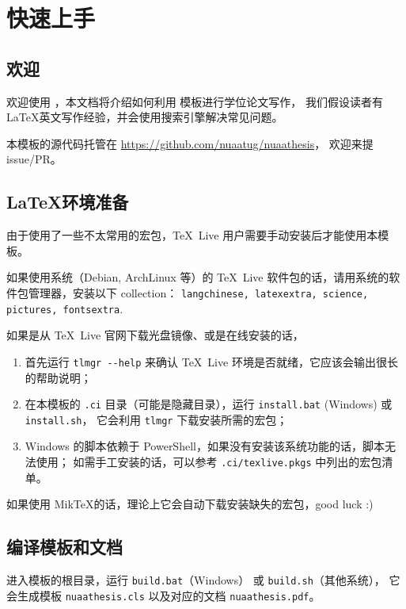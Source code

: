 
\chapter{快速上手}

\section{欢迎}

欢迎使用 \nuaathesis，本文档将介绍如何利用 \nuaathesis 模板进行学位论文写作，
我们假设读者有 \LaTeX 英文写作经验，并会使用搜索引擎解决常见问题。

本模板的源代码托管在 \url{https://github.com/nuaatug/nuaathesis}，
欢迎来提 issue/PR。

\section{\LaTeX 环境准备}

由于\nuaathesis 使用了一些不太常用的宏包，\TeX~Live 用户需要手动安装后才能使用本模板。

如果使用系统（Debian, ArchLinux 等）的 \TeX~Live 软件包的话，请用系统的软件包管理器，安装以下 collection：
\verb|langchinese, latexextra, science, pictures, fontsextra|.

如果是从 \TeX~Live 官网下载光盘镜像、或是在线安装的话，
\begin{enumerate}
  \item 首先运行 \verb|tlmgr --help| 来确认 \TeX~Live 环境是否就绪，它应该会输出很长的帮助说明；
  \item 在本模板的 \verb|.ci| 目录（可能是隐藏目录），运行 \verb|install.bat| (Windows) 或 \verb|install.sh|，
  它会利用 \verb|tlmgr| 下载安装所需的宏包；
  \item Windows 的脚本依赖于 PowerShell，如果没有安装该系统功能的话，脚本无法使用；
  如需手工安装的话，可以参考 \verb|.ci/texlive.pkgs| 中列出的宏包清单。
\end{enumerate}

如果使用 Mik\TeX 的话，理论上它会自动下载安装缺失的宏包，good luck :)

\section{编译模板和文档}

进入模板的根目录，运行 \verb|build.bat|（Windows） 或 \verb|build.sh|（其他系统），
它会生成模板 \verb|nuaathesis.cls| 以及对应的文档 \verb|nuaathesis.pdf|。

